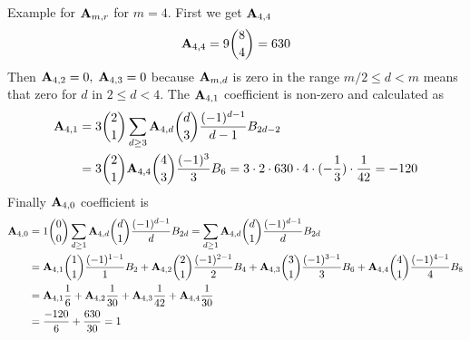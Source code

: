 \begin{examp}
    Example for ${\mathbf{A}} \sb{m,r}$ for $m=4$.
    First we get ${\mathbf{A}} \sb{4,4}$
    \begin{equation*}
        {\mathbf{A}} \sb{4,4} = 9 \binom{8}{4}= 630
    \end{equation*}
    Then ${\mathbf{A}} \sb{4,2} = 0, \; {\mathbf{A}} \sb{4,3} = 0$
    because ${\mathbf{A}} \sb{m,d}$ is zero in the range $m/2 \leq d < m$ means that zero for $d$ in
    $2 \leq d < 4$.
    The ${\mathbf{A}} \sb{4,1}$ coefficient is non-zero and calculated as
    \begin{equation*}
        \begin{split}
            {\mathbf{A}} \sb{4,1}
            &= 3 \binom{2}{1} \sum_{d \geq 3} {\mathbf{A}} \sb{4,d} \binom{d}{3} \frac{(-1)^{d-1}}{d-1} {B}\sb{2d-2} \\
            &= 3 \binom{2}{1} {\mathbf{A}} \sb{4,4} \binom{4}{3} \frac{(-1)^3}{3} {B}\sb{6}
            = 3 \cdot 2 \cdot 630 \cdot 4 \cdot (-\frac{1}{3}) \cdot \frac{1}{42} = -120
        \end{split}
    \end{equation*}
    Finally ${\mathbf{A}} \sb{4,0}$ coefficient is
    \begin{equation*}
        \begin{split}
            {\mathbf{A}} \sb{4,0}
            &= 1 \binom{0}{0} \sum_{d \geq 1} {\mathbf{A}} \sb{4,d} \binom{d}{1} \frac{(-1)^{d-1}}{d} {B}\sb{2d}
            = \sum_{d \geq 1} {\mathbf{A}} \sb{4,d} \binom{d}{1} \frac{(-1)^{d-1}}{d} {B}\sb{2d} \\
            & = {\mathbf{A}} \sb{4,1} \binom{1}{1} \frac{(-1)^{1-1}}{1} {B}\sb{2}
            + {\mathbf{A}} \sb{4,2} \binom{2}{1} \frac{(-1)^{2-1}}{2} {B}\sb{4}
            + {\mathbf{A}} \sb{4,3} \binom{3}{1} \frac{(-1)^{3-1}}{3} {B}\sb{6}
            + {\mathbf{A}} \sb{4,4} \binom{4}{1} \frac{(-1)^{4-1}}{4} {B}\sb{8} \\
            &= {\mathbf{A}} \sb{4,1} \frac{1}{6}
            + {\mathbf{A}} \sb{4,2} \frac{1}{30}
            + {\mathbf{A}} \sb{4,3} \frac{1}{42}
            + {\mathbf{A}} \sb{4,4} \frac{1}{30} \\
            & = \frac{-120}{6} + \frac{630}{30} = 1
        \end{split}
    \end{equation*}
\end{examp}
